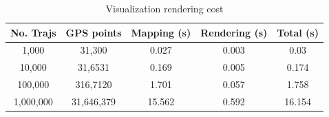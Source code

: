 \begin{table}
	\centering
	\small
	\caption{Visualization rendering cost}
	\begin{tabular}{|c|c|c|c|c|} \hline
		No. Trajs & GPS points & Mapping (s) & Rendering (s) & Total (s)\\ \hline
		1,000& 31,300 & 0.027 & 0.003 & 0.03 \\ \hline
		10,000& 31,6531 & 0.169 & 0.005 & 0.174\\ \hline
		100,000& 316,7120 & 1.701 & 0.057 & 1.758 \\ \hline
		1,000,000& 31,646,379 & 15.562 & 0.592 & 16.154 \\ \hline
	\end{tabular}	\label{tab:gpu}
\end{table}
